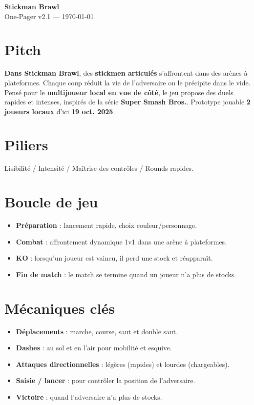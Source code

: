 \documentclass[10.8pt,letterpaper]{article}
\newcommand{\GameTitle}{Stickman Brawl}
\newcommand{\Subtitle}{One-Pager}
\newcommand{\Version}{v2.1 — \today}
\begin{document}
\begin{tcolorbox}
  {\Large \textbf{\GameTitle}}\\[-2pt]
  {\normalsize \Subtitle} \hfill {\footnotesize \Version}
\end{tcolorbox}

\begin{multicols}{2}

\section*{Pitch}
\textbf{Dans Stickman Brawl}, des \textbf{stickmen articulés} s’affrontent dans des arènes à plateformes. 
Chaque coup réduit la vie de l’adversaire ou le précipite dans le vide. 
Pensé pour le \textbf{multijoueur local en vue de côté}, le jeu propose des duels rapides et intenses, 
inspirés de la série \textbf{Super Smash Bros.}. Prototype jouable \textbf{2 joueurs locaux} d'ici \textbf{19 oct. 2025}.

\section*{Piliers}
Lisibilité / Intensité / Maîtrise des contrôles / Rounds rapides.

\section*{Boucle de jeu}
\begin{itemize}
  \item \textbf{Préparation} : lancement rapide, choix couleur/personnage.
  \item \textbf{Combat} : affrontement dynamique 1v1 dans une arène à plateformes.
  \item \textbf{KO} : lorsqu’un joueur est vaincu, il perd une stock et réapparaît.
  \item \textbf{Fin de match} : le match se termine quand un joueur n’a plus de stocks.
\end{itemize}

\section*{Mécaniques clés}
\begin{itemize}
  \item \textbf{Déplacements} : marche, course, saut et double saut.
  \item \textbf{Dashes} : au sol et en l’air pour mobilité et esquive.
  \item \textbf{Attaques directionnelles} : légères (rapides) et lourdes (chargeables).
  \item \textbf{Saisie / lancer} : pour contrôler la position de l’adversaire.
  \item \textbf{Victoire} : quand l’adversaire n’a plus de stocks.
\end{itemize}


\end{multicols}
\end{document}
